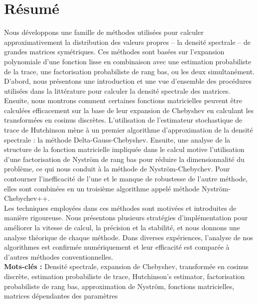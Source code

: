 \chapter*{Résumé}
\label{chp:0-resume}

Nous développons une famille de méthodes utilisées pour calculer approximativement
la distribution des valeurs propres -- la densité spectrale -- de grandes matrices symétriques. Ces méthodes sont basées
sur l'expansion polynomiale d'une fonction lisse en combinaison avec une estimation probabiliste
de la trace, une factorisation probabiliste de rang bas, ou les deux simultanément.\\

D'abord, nous présentons une introduction et une vue d'ensemble des procédures
utilisées dans la littérature pour calculer la densité spectrale des matrices. Ensuite, nous montrons
comment certaines fonctions matricielles peuvent être calculées efficacement sur
la base de leur expansion de Chebyshev en calculant les transformées en cosinus
discrètes. L'utilisation de l'estimateur stochastique de trace de Hutchinson
mène à un premier algorithme d'approximation de la densité spectrale : la
méthode Delta-Gauss-Chebyshev. Ensuite, une analyse de la structure de la
fonction matricielle impliquée dans le calcul motive l'utilisation d'une factorisation de
Nystr\"om de rang bas pour réduire la dimensionnalité du problème, ce qui
nous conduit à la méthode de Nystr\"om-Chebychev. Pour contourner l'inefficacité
de l'une et le manque de robustesse de l'autre méthode, elles sont combinées en
un troisième algorithme appelé méthode Nystr\"om-Chebychev++.\\

Les techniques employées dans ces méthodes sont motivées et introduites de manière
rigoureuse. Nous présentons plusieurs stratégies d'implémentation pour améliorer
la vitesse de calcul, la précision et la stabilité, et nous donnons une analyse
théorique de chaque méthode. Dans diverses expériences, l'analyse de nos algorithmes
est confirmée numériquement et leur efficacité est comparée à d'autres méthodes
conventionnelles.\\

\textbf{Mots-clés :} Densité spectrale, expansion de Chebyshev,
transformée en cosinus discrète, estimation probabiliste de trace,
Hutchinson's estimator, factorisation probabiliste de rang bas, approximation de Nystr\"om,
fonctions matricielles, matrices dépendantes des paramètres

